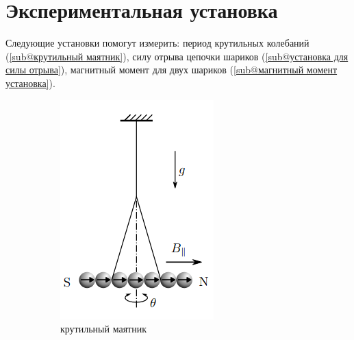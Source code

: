 \documentclass[a4paper, 10pt]{article}
\begin{document}
\section*{Экспериментальная установка}
Следующие установки помогут измерить: период крутильных колебаний (\ref{sub@крутильный маятник}), силу отрыва цепочки шариков (\ref{sub@установка для силы отрыва}),
магнитный момент для двух шариков (\ref{sub@магнитный момент установка}).
\begin{figure}[htbp]
        \centering
        \begin{subfigure}{0.2\textwidth}
            \includegraphics[width=\linewidth]{p1.png}
            \caption{крутильный маятник}
            \label{крутильный маятник}
        \end{subfigure}
        \hspace{2cm}
        \begin{subfigure}{0.2\textwidth}

\end{subfigure}
\end{figure}
\end{document}
